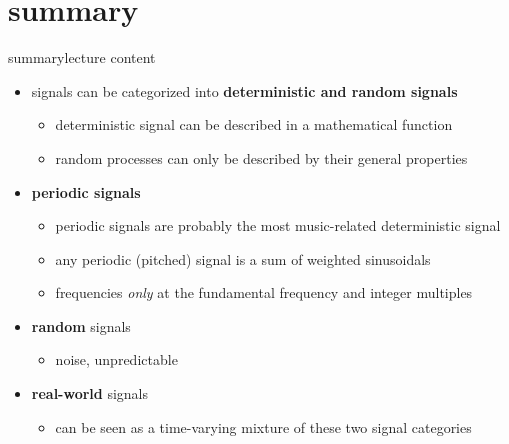     \section{summary}
        \begin{frame}{summary}{lecture content}
            \begin{itemize}
                \item   signals can be categorized into \textbf{deterministic and random signals}
                    \begin{itemize}
                        \item   deterministic signal can be described in a mathematical function
                        \item   random processes can only be described by their general properties
                    \end{itemize}
                \bigskip
                \item      \textbf{periodic signals}
                    \begin{itemize}
                        \item   periodic signals are probably the most music-related deterministic signal
                        \item   any periodic (pitched) signal is a sum of weighted sinusoidals
                        \item   frequencies \textit{only} at the fundamental frequency and integer multiples
                    \end{itemize}
                \bigskip
                \item   \textbf{random} signals
                    \begin{itemize}
                        \item   noise, unpredictable
                    \end{itemize}
                \bigskip
                \item   \textbf{real-world} signals
                    \begin{itemize}
                        \item   can be seen as a time-varying mixture of these two signal categories
                    \end{itemize}
            \end{itemize}
        \end{frame}

